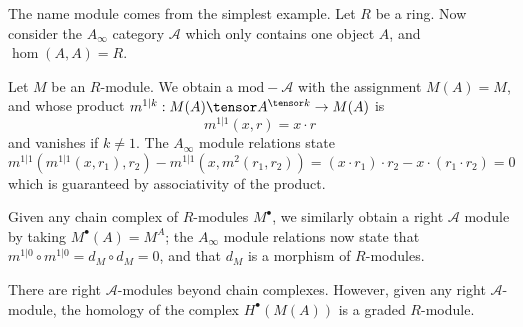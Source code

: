 
The name module comes from the simplest example. Let $R$ be a ring. Now consider the $A_\infty$ category $\mathcal A$ which only contains one object $A$, and $\hom(A, A)=R$. 

Let $M$ be an $R$-module. We obtain a $\text{mod}-\mathcal A$ with the assignment $M(A)=M$,  and whose product $m^{1|k}:M(A)\tensor A^{\tensor k}\to M(A)$ is 
\[
    m^{1|1}(x,r)=x\cdot r
\]
and vanishes if $k\neq 1$. The $A_\infty$ module relations state 
\[m^{1|1}(m^{1|1}(x, r_1),r_2)-m^{1|1}(x, m^2(r_1, r_2))=(x\cdot r_1)\cdot r_2 - x\cdot (r_1\cdot r_2)=0\]
which is guaranteed by associativity of the product. 

Given any chain complex of $R$-modules $M^\bullet$, we similarly obtain a right $\mathcal A$ module by taking $M^\bullet(A)=M^A$; the $A_\infty$ module relations now state that $m^{1|0}\circ m^{1|0}= d_M\circ d_M=0$, and that $d_M$ is a morphism of $R$-modules.

There are right $\mathcal A$-modules beyond chain complexes. However, given any right $\mathcal A$-module, the homology of the complex $H^\bullet(M(A))$ is a graded $R$-module.